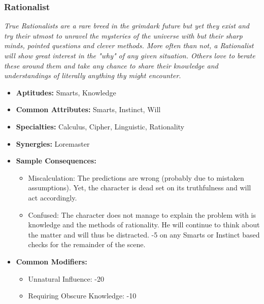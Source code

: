  \subsubsection{Rationalist}\label{Rationalist}
 \textit{True Rationalists are a rare breed in the grimdark future but yet they exist and try their utmost to unravel the mysteries of the universe with but their sharp minds, pointed questions and clever methods.
 More often than not, a Rationalist will show great interest in the "why" of any given situation.
 Others love to berate these around them and take any chance to share their knowledge and understandings of literally anything thy might encounter.}
 \begin{itemize}
 	\item \textbf{Aptitudes:} Smarts, Knowledge
 	\item \textbf{Common Attributes:} Smarts, Instinct, Will
 	\item \textbf{Specialties:} Calculus, Cipher, Linguistic, Rationality
 	\item \textbf{Synergies:} Loremaster
 	\item \textbf{Sample Consequences:} 
 	\begin{itemize}
 		\item Miscalculation: The predictions are wrong (probably due to mistaken assumptions). Yet, the character is dead set on its truthfulness and will act accordingly.
 		\item Confused: The character does not manage to explain the problem with is knowledge and the methods of rationality. He will continue to think about the matter and will thus be distracted. -5 on any Smarts or Instinct based checks for the remainder of the scene.
 	\end{itemize}
 	\item \textbf{Common Modifiers:}
 	\begin{itemize}
 		\item Unnatural Influence: -20
 		\item Requiring Obscure Knowledge: -10
 	\end{itemize}
 \end{itemize}


